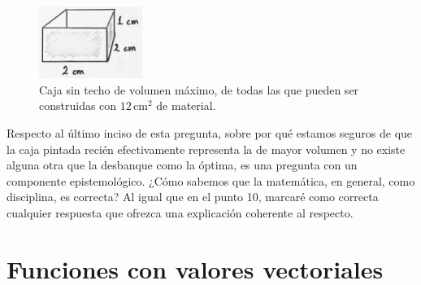 \documentclass{fmbvecto}
\begin{document}
\begin{problema}
\begin{gbox}
    \begin{figure}[H]
        \centering
        \includegraphics[width=0.3\textwidth]{caja-optima.png}
        \caption{Caja sin techo de volumen máximo, de todas las que pueden ser construidas con \(12 \, \mathrm{cm}^2 \) de material.}
    \end{figure}
\end{gbox}

Respecto al último inciso de esta pregunta, sobre por qué estamos seguros de que la caja pintada recién efectivamente representa la de mayor volumen y no existe alguna otra que la desbanque como la óptima, es una pregunta con un componente epistemológico. ¿Cómo sabemos que la matemática, en general, como disciplina, es correcta? Al igual que en el punto 10, marcaré como correcta cualquier respuesta que ofrezca una explicación coherente al respecto.

\end{problema}


\section{Funciones con valores vectoriales}
\end{document}
